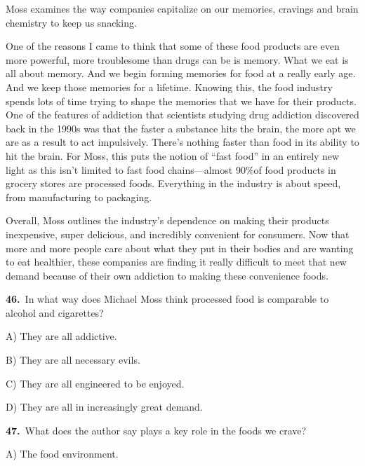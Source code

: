 \smallskip
\noindent Moss examines the way companies capitalize on our memories, cravings and brain chemistry to keep us snacking.\par
\smallskip
\noindent One of the reasons I came to think that some of these food products are even more powerful, more troublesome than drugs can be is memory. What we eat is all about memory. And we begin forming memories for food at a really early age. And we keep those memories for a lifetime. Knowing this, the food industry spends lots of time trying to shape the memories that we have for their products. One of the features of addiction that scientists studying drug addiction discovered back in the 1990s was that the faster a substance hits the brain, the more apt we are as a result to act impulsively. There's nothing faster than food in its ability to hit the brain. For Moss, this puts the notion of ``fast food'' in an entirely new light as this isn't limited to fast food chains---almost 90\%of food products in grocery stores are processed foods. Everything in the industry is about speed, from manufacturing to packaging.\par
\smallskip
\noindent Overall, Moss outlines the industry's dependence on making their products inexpensive, super delicious, and incredibly convenient for consumers. Now that more and more people care about what they put in their bodies and are wanting to eat healthier, these companies are finding it really difficult to meet that new demand because of their own addiction to making these convenience foods.\par
\smallskip
\medskip
\noindent\textbf{46.}\ In what way does Michael Moss think processed food is comparable to alcohol and cigarettes?\par
\noindent\hspace{1.6em}A) They are all addictive.\par
\noindent\hspace{1.6em}B) They are all necessary evils.\par
\noindent\hspace{1.6em}C) They are all engineered to be enjoyed.\par
\noindent\hspace{1.6em}D) They are all in increasingly great demand.\par
\smallskip
\noindent\textbf{47.}\ What does the author say plays a key role in the foods we crave?\par
\noindent\hspace{1.6em}A) The food environment.\par
